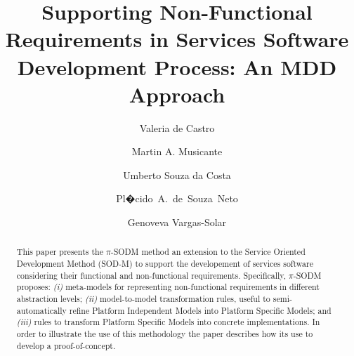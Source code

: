 \documentclass{llncs}
\theoremstyle{plain}
\theoremstyle{plain}
\theoremstyle{plain}
\begin{document}
%

 
\title{Supporting Non-Functional Requirements in Services Software Development Process: An MDD Approach}

\author{Valeria de Castro \and Martin A. Musicante \and Umberto Souza da Costa \and Pl�cido~A.~de~Souza~Neto \and Genoveva Vargas-Solar}



 
\maketitle
\begin{abstract}
This paper presents the $\pi$-SODM method an extension to the Service Oriented Development Method (SOD-M) to support the developement of services software considering their functional and    non-functional requirements. 
Specifically, $\pi$-SODM proposes: 
\textit{(i)} meta-models for representing non-functional requirements in different abstraction levels; 
\textit{(ii)} model-to-model transformation rules, useful to semi-automatically refine Platform Independent Models into Platform Specific Models; and 
\textit{(iii)} rules to transform Platform Specific Models into concrete implementations. 
In order to illustrate the use of this methodology the paper describes how its use to develop a proof-of-concept.
\end{abstract}


\end{document}
